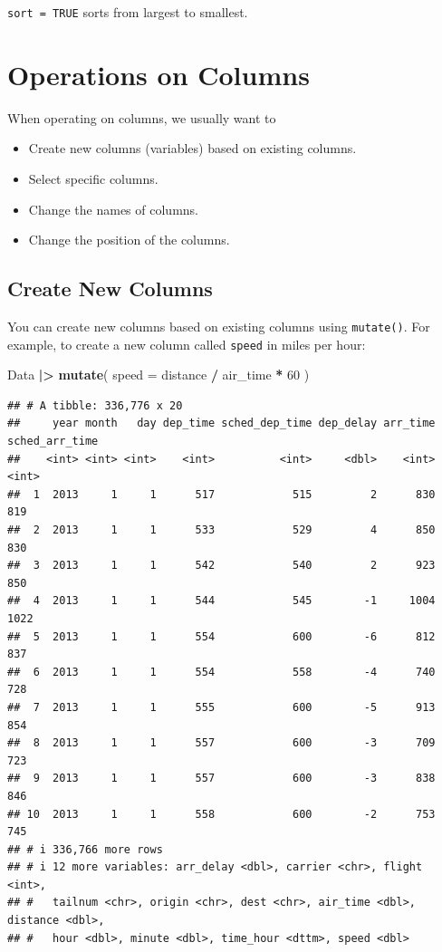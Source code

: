 \documentclass[
]{book}
\newenvironment{Shaded}{\begin{snugshade}}{\end{snugshade}}
\newcommand{\AttributeTok}[1]{\textcolor[rgb]{0.13,0.29,0.53}{#1}}
\newcommand{\DecValTok}[1]{\textcolor[rgb]{0.00,0.00,0.81}{#1}}
\newcommand{\FunctionTok}[1]{\textcolor[rgb]{0.13,0.29,0.53}{\textbf{#1}}}
\newcommand{\NormalTok}[1]{#1}
\newcommand{\SpecialCharTok}[1]{\textcolor[rgb]{0.81,0.36,0.00}{\textbf{#1}}}
\providecommand{\tightlist}{%
  \setlength{\itemsep}{0pt}\setlength{\parskip}{0pt}}
\theoremstyle{definition}
\theoremstyle{definition}
\theoremstyle{definition}
\theoremstyle{definition}
\theoremstyle{remark}
\begin{document}
\texttt{sort\ =\ TRUE} sorts from largest to smallest.

\hypertarget{operations-on-columns}{%
\section{Operations on Columns}\label{operations-on-columns}}

When operating on columns, we usually want to

\begin{itemize}
\tightlist
\item
  Create new columns (variables) based on existing columns.
\item
  Select specific columns.
\item
  Change the names of columns.
\item
  Change the position of the columns.
\end{itemize}

\hypertarget{create-new-columns}{%
\subsection{Create New Columns}\label{create-new-columns}}

You can create new columns based on existing columns using \texttt{mutate()}. For example, to create a new column called \texttt{speed} in miles per hour:

\begin{Shaded}
\begin{Highlighting}[]
\NormalTok{Data }\SpecialCharTok{|\textgreater{}} 
  \FunctionTok{mutate}\NormalTok{(}
    \AttributeTok{speed =}\NormalTok{ distance }\SpecialCharTok{/}\NormalTok{ air\_time }\SpecialCharTok{*} \DecValTok{60}
\NormalTok{  )}
\end{Highlighting}
\end{Shaded}

\begin{verbatim}
## # A tibble: 336,776 x 20
##     year month   day dep_time sched_dep_time dep_delay arr_time sched_arr_time
##    <int> <int> <int>    <int>          <int>     <dbl>    <int>          <int>
##  1  2013     1     1      517            515         2      830            819
##  2  2013     1     1      533            529         4      850            830
##  3  2013     1     1      542            540         2      923            850
##  4  2013     1     1      544            545        -1     1004           1022
##  5  2013     1     1      554            600        -6      812            837
##  6  2013     1     1      554            558        -4      740            728
##  7  2013     1     1      555            600        -5      913            854
##  8  2013     1     1      557            600        -3      709            723
##  9  2013     1     1      557            600        -3      838            846
## 10  2013     1     1      558            600        -2      753            745
## # i 336,766 more rows
## # i 12 more variables: arr_delay <dbl>, carrier <chr>, flight <int>,
## #   tailnum <chr>, origin <chr>, dest <chr>, air_time <dbl>, distance <dbl>,
## #   hour <dbl>, minute <dbl>, time_hour <dttm>, speed <dbl>
\end{verbatim}
\end{document}

